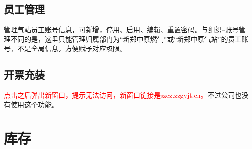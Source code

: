 \documentclass[UTF8]{ctexart}
\begin{document}
\subsection{员工管理}

管理气站员工账号信息，可新增，停用、启用、编辑、重置密码。与组织--账号管理不同的是，这里只能管理归属部门为“新郑中原燃气”或“新郑中原气站”的员工账号，不是全局信息，方便赋予对应权限。

\subsection{开票充装}

\textcolor{red}{点击之后弹出新窗口，提示无法访问，新窗口链接是szcz.zzgyjt.cn。}不过公司也没有使用这个功能。

\section{库存}
\end{document}
